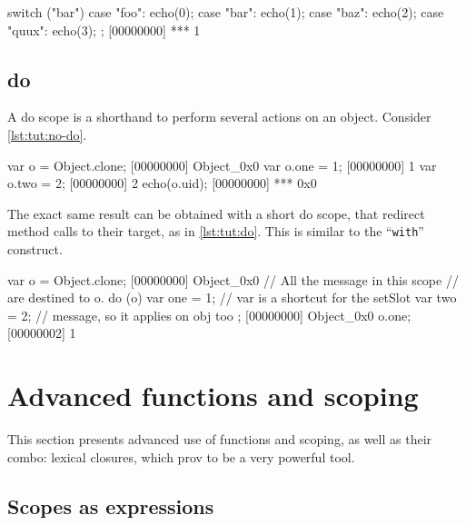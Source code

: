 \begin{urbiscript}[caption=The \lstinline{switch} construct,
label=switch]
switch ("bar")
{
  case "foo":
    echo(0);
  case "bar":
    echo(1);
  case "baz":
    echo(2);
  case "quux":
    echo(3);
};
[00000000] *** 1
\end{urbiscript}

\section{do}
\label{section:constructs/do}

A do scope is a shorthand to perform several actions on an
object. Consider \autoref{lst:tut:no-do}.

\begin{urbiscript}[caption=Lot of code bloat,label=lst:tut:no-do]
var o = Object.clone;
[00000000] Object_0x0
var o.one = 1;
[00000000] 1
var o.two = 2;
[00000000] 2
echo(o.uid);
[00000000] *** 0x0
\end{urbiscript}

The exact same result can be obtained with a short do scope, that
redirect method calls to their target, as in \autoref{lst:tut:do}. This is similar
to the \pascal ``\lstinline{with}'' construct.


\begin{urbiscript}[caption=Shorter with a do block,label=lst:tut:do]
var o = Object.clone;
[00000000] Object_0x0
// All the message in this scope
// are destined to o.
do (o)
{
 var one = 1; // var is a shortcut for the setSlot
 var two = 2; // message, so it applies on obj too
};
[00000000] Object_0x0
o.one;
[00000002] 1
\end{urbiscript}



\chapter{Advanced functions and scoping}

This section presents advanced use of functions and scoping, as well
as their combo: lexical closures, which prov to be a very powerful
tool.

\section{Scopes as expressions}

